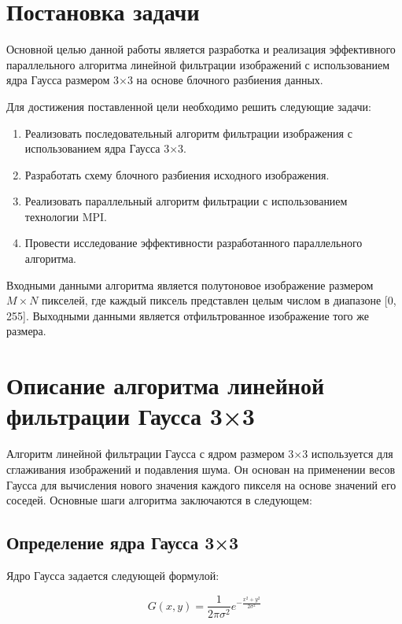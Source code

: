 \documentclass[14pt]{extarticle}
\theoremstyle{definition}
\theoremstyle{remark}
\begin{document}
\newpage

\section{Постановка задачи}
Основной целью данной работы является разработка и реализация эффективного параллельного алгоритма линейной фильтрации изображений с использованием ядра Гаусса размером 3×3 на основе блочного разбиения данных.

Для достижения поставленной цели необходимо решить следующие задачи:

\begin{enumerate}
    \item Реализовать последовательный алгоритм фильтрации изображения с использованием ядра Гаусса 3×3.

    \item Разработать схему блочного разбиения исходного изображения.

    \item Реализовать параллельный алгоритм фильтрации с использованием технологии MPI.

    \item Провести исследование эффективности разработанного параллельного алгоритма.
\end{enumerate}
Входными данными алгоритма является полутоновое изображение размером $M \times N$ пикселей, где каждый пиксель представлен целым числом в диапазоне [0, 255]. Выходными данными является отфильтрованное изображение того же размера.
\clearpage

\section{Описание алгоритма линейной фильтрации Гаусса 3×3}

Алгоритм линейной фильтрации Гаусса с ядром размером 3×3 используется для сглаживания изображений и подавления шума. Он основан на применении весов Гаусса для вычисления нового значения каждого пикселя на основе значений его соседей. Основные шаги алгоритма заключаются в следующем:

\subsection{Определение ядра Гаусса 3×3}

Ядро Гаусса задается следующей формулой:

\begin{equation}
G(x, y) = \frac{1}{2\pi\sigma^2} e^{-\frac{x^2 + y^2}{2\sigma^2}}
\end{equation}
\end{document}
